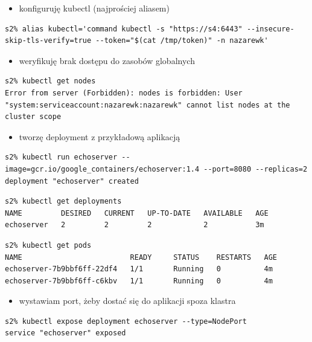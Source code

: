 \documentclass[a4paper,12pt,twoside,openany]{report}
\providecommand{\tightlist}{%
  \setlength{\itemsep}{0pt}\setlength{\parskip}{0pt}}
\begin{document}
\begin{itemize}
\tightlist
\item
  konfiguruję kubectl (najprościej aliasem)
\end{itemize}

\begin{lstlisting}
s2% alias kubectl='command kubectl -s "https://s4:6443" --insecure-skip-tls-verify=true --token="$(cat /tmp/token)" -n nazarewk'
\end{lstlisting}

\begin{itemize}
\tightlist
\item
  weryfikuję brak dostępu do zasobów globalnych
\end{itemize}

\begin{lstlisting}
s2% kubectl get nodes
Error from server (Forbidden): nodes is forbidden: User "system:serviceaccount:nazarewk:nazarewk" cannot list nodes at the cluster scope
\end{lstlisting}

\begin{itemize}
\tightlist
\item
  tworzę deployment z przykładową aplikacją
\end{itemize}

\begin{lstlisting}
s2% kubectl run echoserver --image=gcr.io/google_containers/echoserver:1.4 --port=8080 --replicas=2
deployment "echoserver" created
\end{lstlisting}

\begin{lstlisting}
s2% kubectl get deployments
NAME         DESIRED   CURRENT   UP-TO-DATE   AVAILABLE   AGE
echoserver   2         2         2            2           3m
\end{lstlisting}

\begin{lstlisting}
s2% kubectl get pods
NAME                         READY     STATUS    RESTARTS   AGE
echoserver-7b9bbf6ff-22df4   1/1       Running   0          4m
echoserver-7b9bbf6ff-c6kbv   1/1       Running   0          4m
\end{lstlisting}

\begin{itemize}
\tightlist
\item
  wystawiam port, żeby dostać się do aplikacji spoza klastra
\end{itemize}

\begin{lstlisting}
s2% kubectl expose deployment echoserver --type=NodePort
service "echoserver" exposed
\end{lstlisting}
\end{document}
